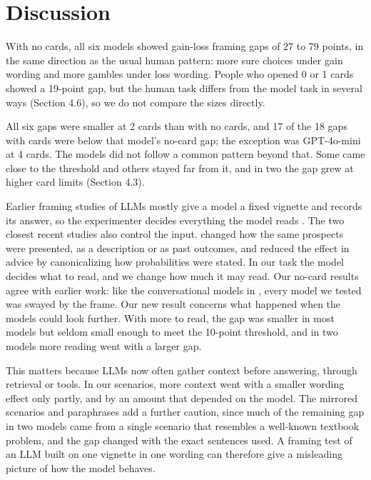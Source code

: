 \documentclass[11pt]{article}
\begin{document}
\section{Discussion}

With no cards, all six models showed gain-loss framing gaps of 27 to 79 points, in the same direction as the usual human pattern: more sure choices under gain wording and more gambles under loss wording. People who opened 0 or 1 cards showed a 19-point gap, but the human task differs from the model task in several ways (Section 4.6), so we do not compare the sizes directly.

All six gaps were smaller at 2 cards than with no cards, and 17 of the 18 gaps with cards were below that model's no-card gap; the exception was GPT-4o-mini at 4 cards. The models did not follow a common pattern beyond that. Some came close to the threshold and others stayed far from it, and in two the gap grew at higher card limits (Section 4.3).

Earlier framing studies of LLMs mostly give a model a fixed vignette and records its answer, so the experimenter decides everything the model reads \citep{binz2023using,echterhoff2024cognitive}. The two closest recent studies also control the input. \citet{ge2026mind} changed how the same prospects were presented, as a description or as past outcomes, and \citet{zhang2026same} reduced the effect in advice by canonicalizing how probabilities were stated. In our task the model decides what to read, and we change how much it may read. Our no-card results agree with earlier work: like the conversational models in \citet{ge2026mind}, every model we tested was swayed by the frame. Our new result concerns what happened when the models could look further. With more to read, the gap was smaller in most models but seldom small enough to meet the 10-point threshold, and in two models more reading went with a larger gap.

This matters because LLMs now often gather context before answering, through retrieval or tools. In our scenarios, more context went with a smaller wording effect only partly, and by an amount that depended on the model. The mirrored scenarios and paraphrases add a further caution, since much of the remaining gap in two models came from a single scenario that resembles a well-known textbook problem, and the gap changed with the exact sentences used. A framing test of an LLM built on one vignette in one wording can therefore give a misleading picture of how the model behaves.
\end{document}
